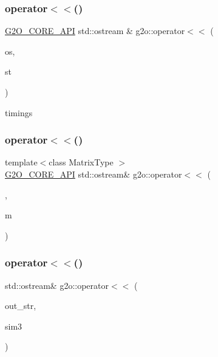 \mbox{\label{namespaceg2o_aab743f811f4b7b6a6e724d64e26b450d}} 
\subsubsection{\texorpdfstring{operator$<$$<$()}{operator<<()}\hspace{0.1cm}{\footnotesize\ttfamily [1/5]}}
{\footnotesize\ttfamily \mbox{\hyperlink{g2o__core__api_8h_a7a8d7648d6f1e26632566f335751d064}{G2\+O\+\_\+\+C\+O\+R\+E\+\_\+\+A\+PI}} std\+::ostream \& g2o\+::operator$<$$<$ (\begin{DoxyParamCaption}\item[{std\+::ostream \&}]{os,  }\item[{const \mbox{\hyperlink{structg2o_1_1_g2_o_batch_statistics}{G2\+O\+Batch\+Statistics}} \&}]{st }\end{DoxyParamCaption})}

timings \mbox{\label{namespaceg2o_a0f97d92b12af077b9a7f5139b60bbf3e}} 
\subsubsection{\texorpdfstring{operator$<$$<$()}{operator<<()}\hspace{0.1cm}{\footnotesize\ttfamily [2/5]}}
{\footnotesize\ttfamily template$<$class Matrix\+Type $>$ \\
\mbox{\hyperlink{g2o__core__api_8h_a7a8d7648d6f1e26632566f335751d064}{G2\+O\+\_\+\+C\+O\+R\+E\+\_\+\+A\+PI}} std\+::ostream\& g2o\+::operator$<$$<$ (\begin{DoxyParamCaption}\item[{std\+::ostream \&}]{,  }\item[{const \mbox{\hyperlink{classg2o_1_1_sparse_block_matrix}{Sparse\+Block\+Matrix}}$<$ Matrix\+Type $>$ \&}]{m }\end{DoxyParamCaption})}

\mbox{\label{namespaceg2o_a8ab958f2ec4a80e849def091d38f1131}} 
\subsubsection{\texorpdfstring{operator$<$$<$()}{operator<<()}\hspace{0.1cm}{\footnotesize\ttfamily [3/5]}}
{\footnotesize\ttfamily std\+::ostream\& g2o\+::operator$<$$<$ (\begin{DoxyParamCaption}\item[{std\+::ostream \&}]{out\+\_\+str,  }\item[{const \mbox{\hyperlink{structg2o_1_1_sim3}{Sim3}} \&}]{sim3 }\end{DoxyParamCaption})\hspace{0.3cm}{\ttfamily [inline]}}

